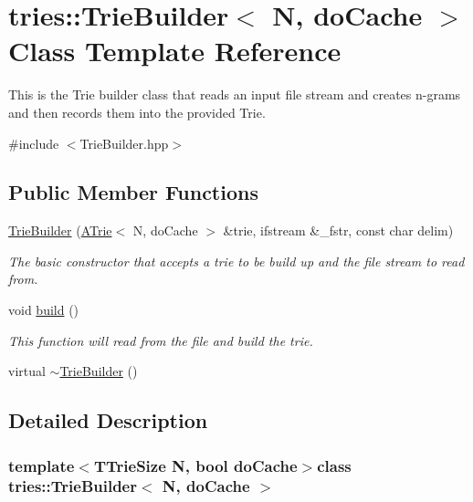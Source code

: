\hypertarget{classtries_1_1_trie_builder}{}\section{tries\+:\+:Trie\+Builder$<$ N, do\+Cache $>$ Class Template Reference}
\label{classtries_1_1_trie_builder}


This is the Trie builder class that reads an input file stream and creates n-\/grams and then records them into the provided Trie.  




{\ttfamily \#include $<$Trie\+Builder.\+hpp$>$}

\subsection*{Public Member Functions}
\begin{DoxyCompactItemize}
\item 
\hyperlink{classtries_1_1_trie_builder_a65c0882287c94452b6720bf956252b60}{Trie\+Builder} (\hyperlink{classtries_1_1_a_trie}{A\+Trie}$<$ N, do\+Cache $>$ \&trie, ifstream \&\+\_\+fstr, const char delim)
\begin{DoxyCompactList}\small\item\em The basic constructor that accepts a trie to be build up and the file stream to read from. \end{DoxyCompactList}\item 
void \hyperlink{classtries_1_1_trie_builder_ac6960b180d338d5c72dfb19bf49db8ee}{build} ()
\begin{DoxyCompactList}\small\item\em This function will read from the file and build the trie. \end{DoxyCompactList}\item 
virtual \hyperlink{classtries_1_1_trie_builder_a3081582b5f85b2bdce4a98021e3b7100}{$\sim$\+Trie\+Builder} ()
\end{DoxyCompactItemize}


\subsection{Detailed Description}
\subsubsection*{template$<$T\+Trie\+Size N, bool do\+Cache$>$class tries\+::\+Trie\+Builder$<$ N, do\+Cache $>$}

